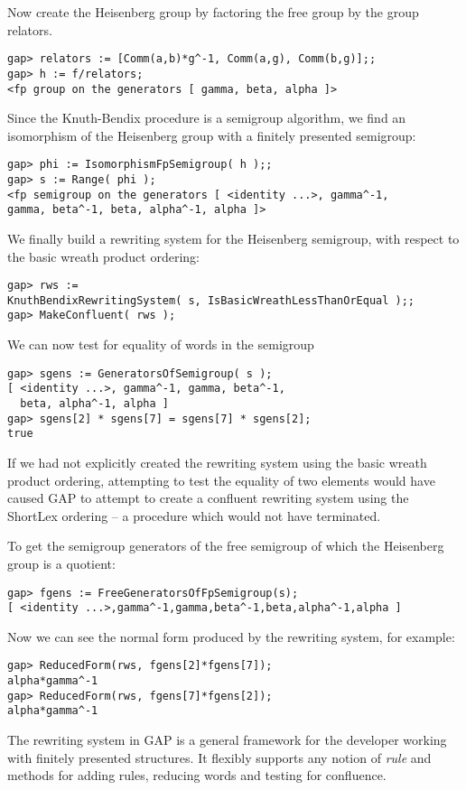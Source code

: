 \documentclass{ws-p8-50x6-00}
\theoremstyle{plain} \newtheorem{Thm}{Theorem}
\theoremstyle{plain} \newtheorem{Cor}{Corollary}
\theoremstyle{plain} \newtheorem{Lemma}{Lemma}
\theoremstyle{plain} \newtheorem{Prop}{Proposition}
\theoremstyle{plain} \newtheorem{Ex}{Exercise}
\def\gap{\sf GAP}
\begin{document}
Now create the Heisenberg group by factoring the free group 
by the group relators.
\begin{verbatim}
gap> relators := [Comm(a,b)*g^-1, Comm(a,g), Comm(b,g)];;
gap> h := f/relators;
<fp group on the generators [ gamma, beta, alpha ]>
\end{verbatim}

Since the Knuth-Bendix procedure is a semigroup algorithm, 
we find an isomorphism of the Heisenberg group with 
a finitely presented semigroup:
\begin{verbatim}
gap> phi := IsomorphismFpSemigroup( h );;
gap> s := Range( phi );
<fp semigroup on the generators [ <identity ...>, gamma^-1, 
gamma, beta^-1, beta, alpha^-1, alpha ]>
\end{verbatim}

We finally build a rewriting system for the Heisenberg semigroup,
with respect to the basic wreath product ordering:
\begin{verbatim}
gap> rws := 
KnuthBendixRewritingSystem( s, IsBasicWreathLessThanOrEqual );;
gap> MakeConfluent( rws );
\end{verbatim}

We can now test for equality of words in the semigroup
\begin{verbatim}
gap> sgens := GeneratorsOfSemigroup( s );
[ <identity ...>, gamma^-1, gamma, beta^-1, 
  beta, alpha^-1, alpha ]
gap> sgens[2] * sgens[7] = sgens[7] * sgens[2];
true
\end{verbatim}

If we had not explicitly created the rewriting system using
the basic wreath product ordering, attempting to test the equality of
two elements would have caused {\gap} to attempt to create a confluent 
rewriting system using the ShortLex ordering  -- 
a procedure which would not have terminated.

To get the semigroup generators of the free semigroup of which 
the Heisenberg group is a quotient:
\begin{verbatim}
gap> fgens := FreeGeneratorsOfFpSemigroup(s);
[ <identity ...>,gamma^-1,gamma,beta^-1,beta,alpha^-1,alpha ]
\end{verbatim}
Now we can see the normal form produced by the rewriting system, for example:
\begin{verbatim}
gap> ReducedForm(rws, fgens[2]*fgens[7]);
alpha*gamma^-1
gap> ReducedForm(rws, fgens[7]*fgens[2]);
alpha*gamma^-1
\end{verbatim}

The rewriting system in {\gap} is a  general framework for the developer 
working with finitely presented structures.
It flexibly supports any  notion of 
{\em rule} and methods for
adding rules, reducing words and testing for confluence. 
\end{document}
